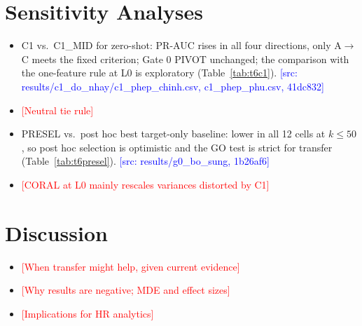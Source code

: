 \documentclass[conference]{IEEEtran}
\newcommand{\todoSV}[1]{\textcolor{red}{[#1]}}
\newcommand{\src}[1]{\textcolor{blue}{\scriptsize[src: #1]}}
\begin{document}
\section{Sensitivity Analyses}  %
\begin{itemize}
  \item C1 vs.\ C1\_MID for zero-shot: PR-AUC rises in all four directions, only A$\to$C meets the fixed criterion; Gate 0 PIVOT unchanged; the comparison with the one-feature rule at L0 is exploratory (Table~\ref{tab:t6c1}). \src{results/c1\_do\_nhay/c1\_phep\_chinh.csv, c1\_phep\_phu.csv, 41dc832}
  \item \todoSV{Neutral tie rule}
  \item PRESEL vs.\ post hoc best target-only baseline: lower in all 12 cells at $k \le 50$, so post hoc selection is optimistic and the GO test is strict for transfer (Table~\ref{tab:t6presel}). \src{results/g0\_bo\_sung, 1b26af6}
  \item \todoSV{CORAL at L0 mainly rescales variances distorted by C1}
\end{itemize}
\begin{table}[!t]\centering\scriptsize
\caption{\todoSV{C1\_MID minus C1 caption}}\label{tab:t6c1}

\end{table}
\begin{table}[!t]\centering\scriptsize
\caption{\todoSV{PRESEL minus post hoc best caption}}\label{tab:t6presel}

\end{table}

\section{Discussion}  %
\begin{itemize}
  \item \todoSV{When transfer might help, given current evidence}
  \item \todoSV{Why results are negative; MDE and effect sizes}
  \item \todoSV{Implications for HR analytics}
\end{itemize}
\end{document}
